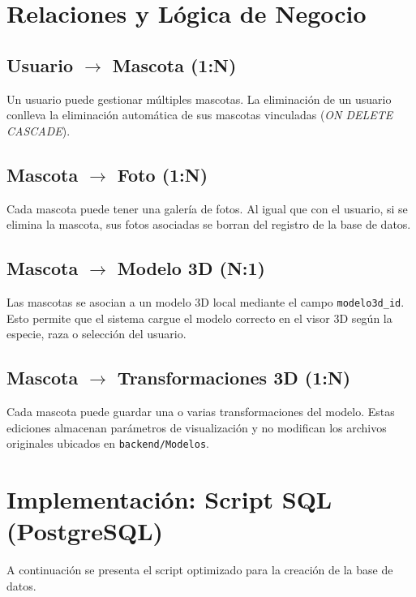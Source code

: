 \documentclass[12pt,a4paper]{article}
\begin{document}
\section{Relaciones y Lógica de Negocio}

\subsection{Usuario $\rightarrow$ Mascota (1:N)}
Un usuario puede gestionar múltiples mascotas. La eliminación de un usuario conlleva la eliminación automática de sus mascotas vinculadas (\textit{ON DELETE CASCADE}).

\subsection{Mascota $\rightarrow$ Foto (1:N)}
Cada mascota puede tener una galería de fotos. Al igual que con el usuario, si se elimina la mascota, sus fotos asociadas se borran del registro de la base de datos.

\subsection{Mascota $\rightarrow$ Modelo 3D (N:1)}
Las mascotas se asocian a un modelo 3D local mediante el campo \texttt{modelo3d\_id}. Esto permite que el sistema cargue el modelo correcto en el visor 3D según la especie, raza o selección del usuario.

\subsection{Mascota $\rightarrow$ Transformaciones 3D (1:N)}
Cada mascota puede guardar una o varias transformaciones del modelo. Estas ediciones almacenan parámetros de visualización y no modifican los archivos originales ubicados en \texttt{backend/Modelos}.

\newpage
\section{Implementación: Script SQL (PostgreSQL)}

A continuación se presenta el script optimizado para la creación de la base de datos.
\end{document}
